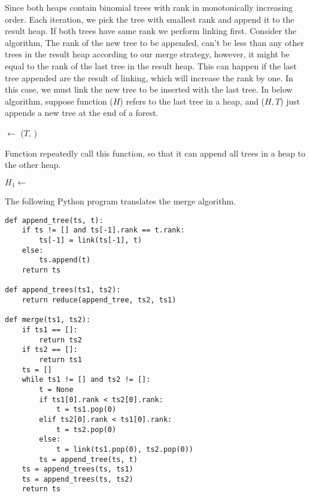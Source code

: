 \documentclass{article}
\begin{document}
Since both heaps contain binomial trees with rank in monotonically 
increasing order. Each iteration, we pick the tree with smallest
rank and append it to the result heap. If both trees have same rank
we perform linking first. Consider the  algorithm,
The rank of the new tree to be appended, can't be less than
any other trees in the result heap according to our merge strategy,
however, it might be equal to the rank of the last tree in the 
result heap. This can happen if the last tree appended are the
result of linking, which will increase the rank by one. In this
case, we must link the new tree to be inserted with the last tree.
In below algorithm, suppose function ($H$) refers 
to the last tree in a heap, and ($H, T$) just 
appends a new tree at the end of a forest. 

\begin{algorithmic}
    \State {} $\gets$ ($T$, )
  \Else
    \State {}
  \EndIf
\EndFunction
\end{algorithmic}

Function  repeatedly call this function, so 
that it can append all trees in a heap to the other heap.

\begin{algorithmic}
    \State $H_1 \gets $ 
  \EndFor
\EndFunction
\end{algorithmic}

The following Python program translates the merge algorithm.

\lstset{language=Python}
\begin{lstlisting}
def append_tree(ts, t):
    if ts != [] and ts[-1].rank == t.rank:
        ts[-1] = link(ts[-1], t)
    else:
        ts.append(t)
    return ts

def append_trees(ts1, ts2):
    return reduce(append_tree, ts2, ts1)

def merge(ts1, ts2):
    if ts1 == []:
        return ts2
    if ts2 == []:
        return ts1
    ts = []
    while ts1 != [] and ts2 != []:
        t = None
        if ts1[0].rank < ts2[0].rank:
            t = ts1.pop(0)
        elif ts2[0].rank < ts1[0].rank:
            t = ts2.pop(0)
        else:
            t = link(ts1.pop(0), ts2.pop(0))
        ts = append_tree(ts, t)
    ts = append_trees(ts, ts1)
    ts = append_trees(ts, ts2)
    return ts
\end{lstlisting}
\end{document}
